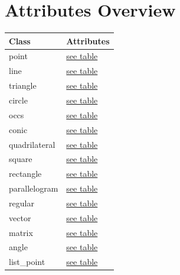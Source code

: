 \documentclass[
  DIV=16,
  fontsize=10,
  index=totoc,
  twoside,
  cadre,
  headings=small
]{tkz-doc}
\begin{document}
\clearpage
\listofoverviews

\clearpage
\section*{Attributes Overview}
\begin{tabular}{ll}
\textbf{Class} & \textbf{Attributes} \\
\hline
point         & \hyperref[point:attributes]{see table}        \\
line          & \hyperref[line:attributes]{see table}         \\
triangle      & \hyperref[triangle:attributes]{see table}     \\
circle        & \hyperref[circle:attributes]{see table}       \\
occs          & \hyperref[occs:attributes]{see table}         \\
conic         & \hyperref[conic:attributes]{see table}        \\
quadrilateral & \hyperref[quadrilateral:attributes]{see table}\\
square        & \hyperref[square:attributes]{see table}       \\
rectangle     & \hyperref[rectangle:attributes]{see table}    \\
parallelogram & \hyperref[parallelogram:attributes]{see table}\\
regular       & \hyperref[regular:attributes]{see table}      \\
vector        & \hyperref[vector:attributes]{see table}       \\
matrix        & \hyperref[matrix:attributes]{see table}       \\
angle         & \hyperref[angle:attributes]{see table}        \\
list\_point   & \hyperref[list_point:attributes]{see table}   \\
\end{tabular}
\end{document}
